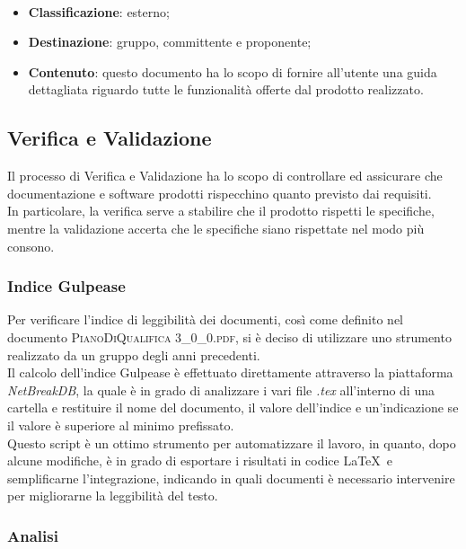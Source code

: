 		\paragraph{\MU}
		\begin{itemize}
			\item \textbf{Classificazione}: esterno;
			\item \textbf{Destinazione}: gruppo, committente e proponente;
			\item \textbf{Contenuto}: questo documento ha lo scopo di fornire all'utente una guida dettagliata riguardo tutte le funzionalità offerte dal prodotto realizzato.
		\end{itemize}

	\subsection{Verifica e Validazione}
	Il processo di Verifica e Validazione ha lo scopo di controllare ed assicurare che documentazione e software prodotti rispecchino quanto previsto dai requisiti.\\
	In particolare, la verifica serve a stabilire che il prodotto rispetti le specifiche, mentre la validazione accerta che le specifiche siano rispettate nel modo più consono.

		\subsubsection{Indice Gulpease}
		Per verificare l'indice di leggibilità dei documenti, così come definito nel documento \textsc{PianoDiQualifica 3\_0\_0.pdf}, si è deciso di utilizzare uno strumento realizzato da un gruppo degli anni precedenti.\\
		Il calcolo dell'indice Gulpease è effettuato direttamente attraverso la piattaforma \textit{NetBreakDB}, la quale è in grado di analizzare i vari file \textit{.tex} all'interno di una cartella e restituire il nome del documento, il valore dell'indice e un'indicazione se il valore è superiore al minimo prefissato.\\
		Questo script è un ottimo strumento per automatizzare il lavoro, in quanto, dopo alcune modifiche, è in grado di esportare i risultati in codice \LaTeX\ e semplificarne l'integrazione, indicando in quali documenti è necessario intervenire per migliorarne la leggibilità del testo.
		
		\subsubsection{Analisi}

